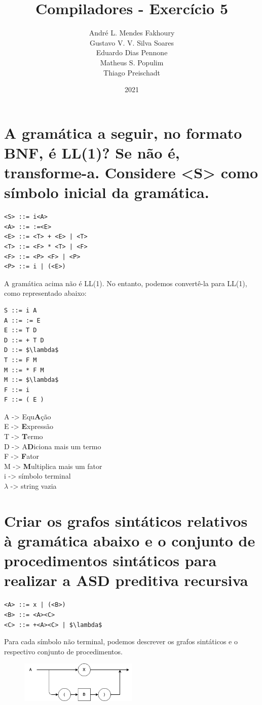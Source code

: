 \documentclass{article}
\title{Compiladores - Exercício 5}
\author{André L. Mendes Fakhoury\\
Gustavo V. V. Silva Soares\\
Eduardo Dias Pennone\\
Matheus S. Populim\\
Thiago Preischadt\\
}
\date{2021}
\begin{document}
\maketitle

\section{A gramática a seguir, no formato BNF, é LL(1)? Se não é, transforme-a. Considere <S> como símbolo inicial da gramática.}

\begin{verbatim}
<S> ::= i<A>
<A> ::= :=<E>
<E> ::= <T> + <E> | <T>
<T> ::= <F> * <T> | <F>
<F> ::= <P> <F> | <P>
<P> ::= i | (<E>)
\end{verbatim}

A gramática acima não é LL(1). No entanto, podemos convertê-la para LL(1), como representado abaixo:

\begin{lstlisting}
S ::= i A
A ::= := E
E ::= T D
D ::= + T D
D ::= $\lambda$
T ::= F M
M ::= * F M
M ::= $\lambda$
F ::= i
F ::= ( E )
\end{lstlisting}
A -> Equ\textbf{A}ção\\
E -> \textbf{E}xpressão\\ 
T -> \textbf{T}ermo\\
D -> A\textbf{D}iciona mais um termo\\
F -> \textbf{F}ator\\
M -> \textbf{M}ultiplica mais um fator\\
i -> símbolo terminal\\
$\lambda$ -> string vazia 
\newpage

\section{Criar os grafos sintáticos relativos à gramática abaixo e o conjunto de procedimentos sintáticos para realizar a ASD preditiva recursiva}

\begin{lstlisting}
<A> ::= x | (<B>)
<B> ::= <A><C>
<C> ::= +<A><C> | $\lambda$
\end{lstlisting}

Para cada símbolo não terminal, podemos descrever os grafos sintáticos e o respectivo conjunto de procedimentos.

\begin{figure}[ht!]
    \centering
    \includegraphics[width=0.5\textwidth]{ex5/A.png}
\end{figure}
\end{document}
